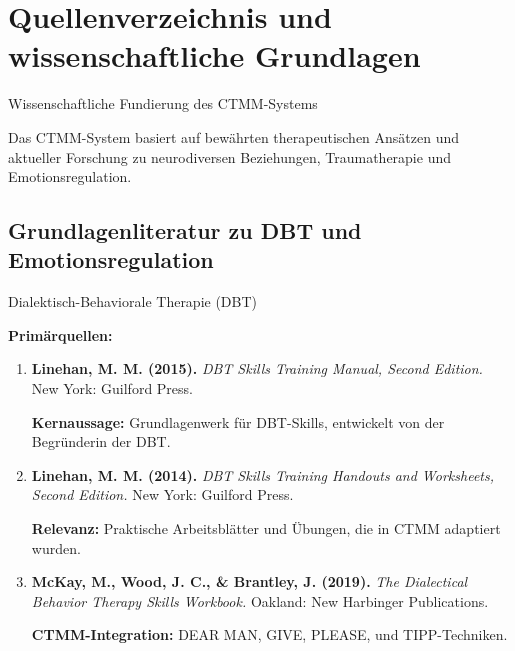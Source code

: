 
\section{Quellenverzeichnis und wissenschaftliche Grundlagen}
\label{sec:bibliography}

\begin{ctmmBlueBox}{Wissenschaftliche Fundierung des CTMM-Systems}

Das CTMM-System basiert auf bewährten therapeutischen Ansätzen und aktueller Forschung zu neurodiversen Beziehungen, Traumatherapie und Emotionsregulation.

\end{ctmmBlueBox}

\subsection{Grundlagenliteratur zu DBT und Emotionsregulation}

\begin{ctmmGreenBox}{Dialektisch-Behaviorale Therapie (DBT)}

\textbf{Primärquellen:}
\begin{enumerate}
  \item \textbf{Linehan, M. M. (2015).} \textit{DBT Skills Training Manual, Second Edition.} New York: Guilford Press.

  \textbf{Kernaussage:} Grundlagenwerk für DBT-Skills, entwickelt von der Begründerin der DBT.

  \item \textbf{Linehan, M. M. (2014).} \textit{DBT Skills Training Handouts and Worksheets, Second Edition.} New York: Guilford Press.

  \textbf{Relevanz:} Praktische Arbeitsblätter und Übungen, die in CTMM adaptiert wurden.

  \item \textbf{McKay, M., Wood, J. C., \& Brantley, J. (2019).} \textit{The Dialectical Behavior Therapy Skills Workbook.} Oakland: New Harbinger Publications.

  \textbf{CTMM-Integration:} DEAR MAN, GIVE, PLEASE, und TIPP-Techniken.
\end{enumerate}

\end{ctmmGreenBox}

